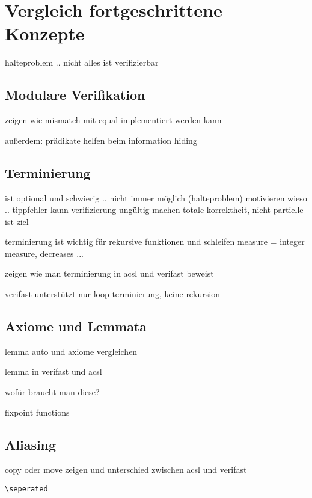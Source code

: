 ﻿
\chapter{Vergleich fortgeschrittene Konzepte}

halteproblem .. nicht alles ist verifizierbar

\section{Modulare Verifikation}

zeigen wie mismatch mit equal implementiert werden kann

außerdem: prädikate helfen beim information hiding

\section{Terminierung}

ist optional und schwierig .. nicht immer möglich (halteproblem)
motivieren wieso .. tippfehler kann verifizierung ungültig machen
totale korrektheit, nicht partielle ist ziel


terminierung ist wichtig für rekursive funktionen und schleifen
measure = integer measure, decreases ...

zeigen wie man terminierung in acsl und verifast beweist

verifast unterstützt nur loop-terminierung, keine rekursion


\section{Axiome und Lemmata}

lemma auto und axiome vergleichen

lemma in verifast und acsl

wofür braucht man diese?

fixpoint functions

\section{Aliasing}

copy oder move zeigen und unterschied zwischen acsl und verifast

\lstinline{\seperated}


